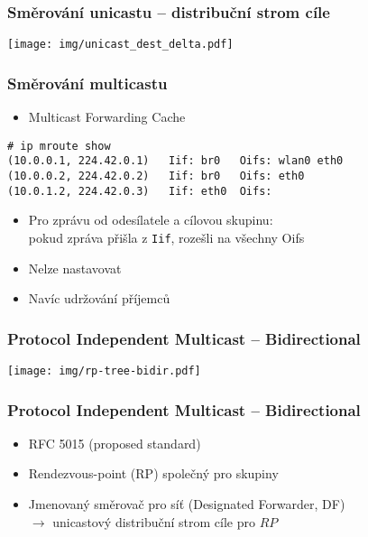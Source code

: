 \documentclass{beamer}
\begin{document}
\begin{frame}
	\frametitle{Směrování unicastu -- distribuční strom cíle}
	
	\begin{center}
	\texttt{[image: img/unicast\_dest\_delta.pdf]}
	\end{center}
\end{frame}

\begin{frame}[fragile]
  \frametitle{Směrování multicastu}

	\begin{itemize}
	  \item Multicast Forwarding Cache
	\end{itemize}
\begin{verbatim}
# ip mroute show
(10.0.0.1, 224.42.0.1)   Iif: br0   Oifs: wlan0 eth0
(10.0.0.2, 224.42.0.2)   Iif: br0   Oifs: eth0
(10.0.1.2, 224.42.0.3)   Iif: eth0  Oifs:
\end{verbatim}
	\begin{itemize}
	  \item Pro zprávu od odesílatele a cílovou skupinu: \\
	    \quad pokud zpráva přišla z \texttt{Iif}, rozešli na všechny Oifs
	  \item Nelze nastavovat 
	  \item Navíc udržování příjemců
	\end{itemize}
\end{frame}

\begin{frame}\frametitle{Protocol Independent Multicast -- Bidirectional}
  \begin{center}
    \texttt{[image: img/rp-tree-bidir.pdf]}
  \end{center}
\end{frame}

\begin{frame}\frametitle{Protocol Independent Multicast -- Bidirectional}
  \begin{itemize}
    \item RFC 5015 (proposed standard)
    \item Rendezvous-point (RP) společný pro skupiny
    \item Jmenovaný směrovač pro síť (Designated Forwarder, DF) \\
      \bigskip \pause
      $\rightarrow$ unicastový distribuční strom cíle pro $RP$
  \end{itemize}
\end{frame}
\end{document}
